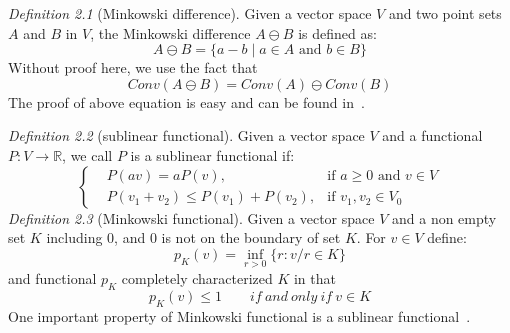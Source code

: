 \documentclass{article}
\begin{document}
\emph{Definition 2.1} (Minkowski difference). Given a vector space $V$ and two point sets $A$ and $B$ in $V$, the Minkowski difference $A\ominus B$ is 
defined as:
\begin{equation*}
	A\ominus B=\{a-b\mid a\in A\text{ and }b\in B\}
\end{equation*}
Without proof here, we use the fact that
\begin{equation}\label{eq:Minkowski sum}
	Conv(A\ominus B)=Conv(A)\ominus Conv(B)
\end{equation}
The proof of above equation is easy and can be found in~\cite{625624}.\par

\emph{Definition 2.2} (sublinear functional). Given a vector space $V$ and a functional $P:V\to\mathbb{R}$, we call $P$ is a
sublinear functional if:
\begin{equation}\label{property:sublinear}
	\left\{\begin{aligned}
		 & P(av)=aP(v),                  & \mbox{if $a \geq 0$ and $v\in V$} \\
		 & P(v_1+v_2)\leq P(v_1)+P(v_2), & \mbox{if $v_1,v_2\in V_0$}
	\end{aligned}
	\right.
\end{equation}
\emph{Definition 2.3} (Minkowski functional). Given a vector space $V$ and a non empty set $K$ including $0$, and $0$ is not on the boundary of set $K$. 
For $v \in V$ define:
\begin{equation*}
	p_K(v)=\inf_{r>0}\{r: v/r \in K\}
\end{equation*}
and functional $p_K$ completely characterized $K$ in that
\begin{equation*}
	p_K(v)\leq 1\qquad if~and~only~if~v \in K
\end{equation*}
One important property of Minkowski functional is a sublinear functional~\cite{stein2011functional}.\par
\end{document}

